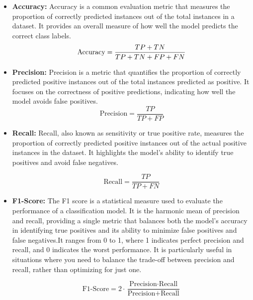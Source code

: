 \begin{itemize}
    \item \textbf{Accuracy: }Accuracy is a common evaluation metric that measures the proportion of correctly predicted instances out of the total instances in a
dataset. It provides an overall measure of how well the model predicts the
correct class labels. \\
\begin{equation}
\text{Accuracy} = \frac{TP + TN}{TP + TN + FP + FN}
\\
\end{equation}

\item \textbf{Precision: }Precision is a metric that quantifies the proportion of correctly
predicted positive instances out of the total instances predicted as positive.
It focuses on the correctness of positive predictions, indicating how well the
model avoids false positives.
\\
\begin{equation}
\text{Precision} = \frac{TP}{TP + FP}
\end{equation}

\item \textbf{Recall: }Recall, also known as sensitivity or true positive rate, measures the
proportion of correctly predicted positive instances out of the actual positive
instances in the dataset. It highlights the model’s ability to identify true
positives and avoid false negatives.

\begin{equation}
\text{Recall} = \frac{TP}{TP + FN}
\end{equation}

\item \textbf{F1-Score: }The F1 score is a statistical measure used to evaluate the performance of a classification model. It is the harmonic mean of precision and recall, providing a single metric that balances both the model's accuracy in identifying true positives and its ability to minimize false positives and false negatives.It ranges from 0 to 1, where 1 indicates perfect precision and recall, and 0 indicates the worst performance. It is particularly useful in situations where you need to balance the trade-off between precision and recall, rather than optimizing for just one.

\begin{equation}
\text{F1-Score} = 2 \cdot \frac{\text{Precision} \cdot \text{Recall}}{\text{Precision} + \text{Recall}}
\end{equation}


\end{itemize}
